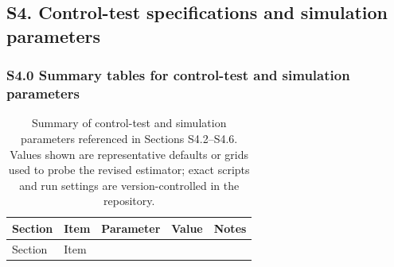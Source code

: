 \documentclass[
]{article}
\begin{document}
\subsection{S4. Control-test specifications and simulation
parameters}\label{s4.-control-test-specifications-and-simulation-parameters}

\subsubsection{S4.0 Summary tables for control-test and simulation
parameters}\label{s4.0-summary-tables-for-control-test-and-simulation-parameters}

\begin{longtable}[]{@{}
  >{\raggedright\arraybackslash}p{}
  >{\raggedright\arraybackslash}p{}
  >{\raggedright\arraybackslash}p{}
  >{\raggedright\arraybackslash}p{}
  >{\raggedright\arraybackslash}p{}@{}}
\caption{Summary of control-test and simulation parameters referenced in
Sections S4.2--S4.6. Values shown are representative defaults or grids
used to probe the revised estimator; exact scripts and run settings are
version-controlled in the
repository.}\label{tbl:si_sim_params}\tabularnewline
\toprule\noalign{}
\begin{minipage}[b]{\linewidth}\raggedright
Section
\end{minipage} & \begin{minipage}[b]{\linewidth}\raggedright
Item
\end{minipage} & \begin{minipage}[b]{\linewidth}\raggedright
Parameter
\end{minipage} & \begin{minipage}[b]{\linewidth}\raggedright
Value
\end{minipage} & \begin{minipage}[b]{\linewidth}\raggedright
Notes
\end{minipage} \\
\midrule\noalign{}
\endfirsthead
\toprule\noalign{}
\begin{minipage}[b]{\linewidth}\raggedright
Section
\end{minipage} & \begin{minipage}[b]{\linewidth}\raggedright
Item
\end{minipage} & \begin{minipage}[b]{\linewidth}\raggedright

\end{minipage}
\end{longtable}
\end{document}
